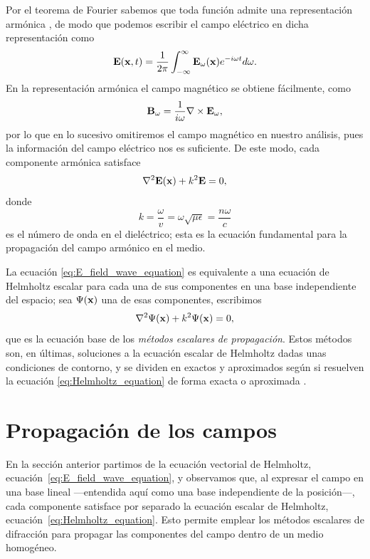 Por el teorema de Fourier sabemos que toda función admite una representación armónica \cite{arfken2013}, de modo que podemos escribir el campo eléctrico en dicha representación como
\begin{equation}
    \vb{E}(\vb x, t) = \frac{1}{2\pi}\int_{-\infty}^{\infty} \vb{E}_\omega(\vb x) e^{-i\omega t} d\omega.
    \label{eq:E_field_harmonic_representation}
\end{equation}
En la representación armónica el campo magnético se obtiene fácilmente, como
\begin{equation}
    \vb{B}_\omega = \frac{1}{i\omega} \nabla \times \vb{E}_\omega,
    \label{eq:B_harmonic_func_of_E_harmonic}
\end{equation}
por lo que en lo sucesivo omitiremos el campo magnético en nuestro análisis, pues la información del campo eléctrico nos es suficiente. De este modo, cada componente armónica satisface
\begin{equation}
    \nabla^2 \vb{E}(\vb x) + k^2 \vb E = 0,
    \label{eq:E_field_wave_equation}
\end{equation}
donde
\[
k = \frac{\omega}{v} = \omega\sqrt{\mu\epsilon} = \frac{n\omega}{c}
\]
es el número de onda en el dieléctrico; esta es la ecuación fundamental para la propagación del campo armónico en el medio.

La ecuación \eqref{eq:E_field_wave_equation} es equivalente a una ecuación de Helmholtz escalar para cada una de sus componentes en una base independiente del espacio; sea $\Psi(\vb x)$ una de esas componentes, escribimos
\begin{equation}
    \nabla^2 \Psi (\vb x) + k^2 \Psi (\vb x) = 0,
    \label{eq:Helmholtz_equation}
\end{equation}
que es la ecuación base de los \textit{métodos escalares de propagación}. Estos métodos son, en últimas, soluciones a la ecuación escalar de Helmholtz dadas unas condiciones de contorno, y se dividen en exactos y aproximados según si resuelven la ecuación \eqref{eq:Helmholtz_equation} de forma exacta o aproximada \cite{goodman2005}.


\section{Propagación de los campos}

En la sección anterior partimos de la ecuación vectorial de Helmholtz,
ecuación~\eqref{eq:E_field_wave_equation}, y observamos que, al expresar el
campo en una base lineal ---entendida aquí como una base independiente de la
posición---, cada componente satisface por separado la ecuación escalar de Helmholtz,
ecuación~\eqref{eq:Helmholtz_equation}. Esto permite emplear los métodos
escalares de difracción para propagar las componentes del campo dentro de un
medio homogéneo.

